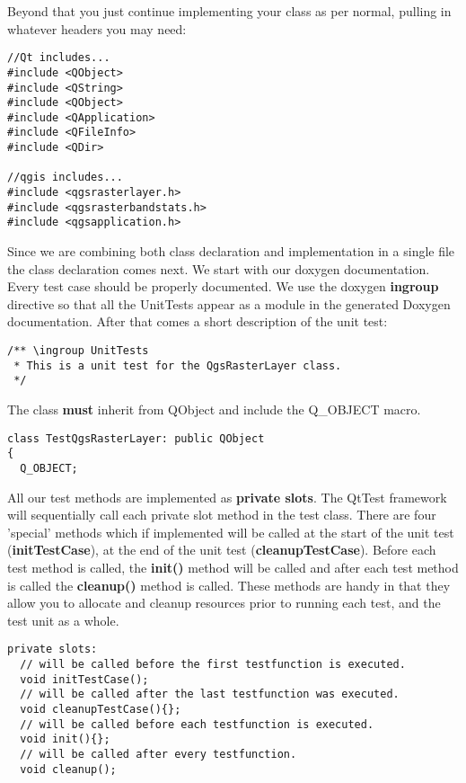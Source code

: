 Beyond that you just continue implementing your class as per normal, pulling 
in whatever headers you may need:

\begin{verbatim}
//Qt includes...
#include <QObject>
#include <QString>
#include <QObject>
#include <QApplication>
#include <QFileInfo>
#include <QDir>

//qgis includes...
#include <qgsrasterlayer.h> 
#include <qgsrasterbandstats.h> 
#include <qgsapplication.h>
\end{verbatim}

Since we are combining both class declaration and implementation in a single
file the class declaration comes next. We start with our doxygen documentation.
Every test case should be properly documented. We use the doxygen \textbf{ingroup}
directive so that all the UnitTests appear as a module in the generated Doxygen
documentation. After that comes a short description of the unit test:

\begin{verbatim}
/** \ingroup UnitTests
 * This is a unit test for the QgsRasterLayer class.
 */
\end{verbatim}

The class \textbf{must} inherit from QObject and include the Q\_OBJECT macro.

\begin{verbatim}
class TestQgsRasterLayer: public QObject
{
  Q_OBJECT;
\end{verbatim}

All our test methods are implemented as \textbf{private slots}. The QtTest framework
will sequentially call each private slot method in the test class. There are
four 'special' methods which if implemented will be called at the start of the
unit test (\textbf{initTestCase}), at the end of the unit test
(\textbf{cleanupTestCase}).  Before each test method is called, the \textbf{init()}
method will be called and after each test method is called the \textbf{cleanup()}
method is called. These methods are handy in that they allow you to allocate
and cleanup resources prior to running each test, and the test unit as a whole.

\begin{verbatim}
private slots:
  // will be called before the first testfunction is executed.
  void initTestCase();
  // will be called after the last testfunction was executed.
  void cleanupTestCase(){};
  // will be called before each testfunction is executed.
  void init(){};
  // will be called after every testfunction.
  void cleanup();
\end{verbatim}

